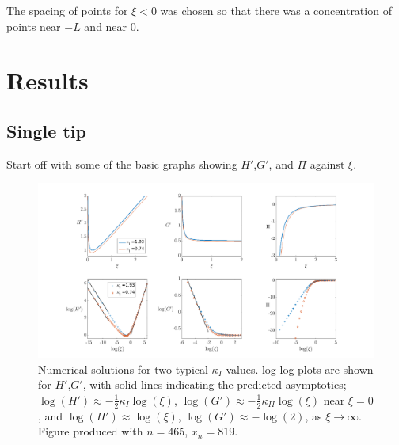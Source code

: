 \documentclass{jfm}
\begin{document}
The spacing of points for $\xi<0$ was chosen so that there was a concentration
of points near $-L$ and near $0$.

%
%
% 
\clearpage
\section{Results}\label{sec:Results}
%
%
%
\subsection{Single tip}
Start off with some of the basic graphs showing $H'$,$G'$, and $\Pi$ against
$\xi$.
\begin{figure}
  \centerline{\includegraphics[scale=0.3]{./../../Graphs/hprime-p-x-full.png}}
  \caption{Numerical solutions for two typical $\kappa_I$ values. log-log plots
           are shown for $H'$,$G'$, with solid lines indicating the predicted 
           asymptotics; $\log(H') \approx -\frac{1}{2}\kappa_I \log(\xi)$, 
           $\log(G') \approx -\frac{1}{2} \kappa_{II}\log(\xi)$ near $\xi=0$, 
           and $\log(H') \approx \log(\xi)$, $\log(G') \approx -\log(2)$, as 
           $\xi \to \infty$. Figure produced with $n=465$, $x_n=819$.}
\end{figure}
\end{document}
